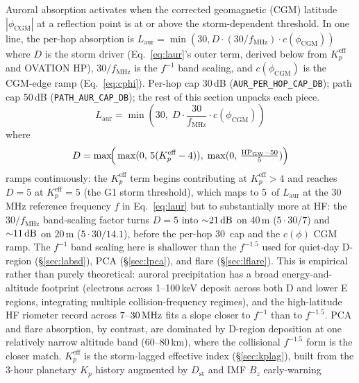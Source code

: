 \documentclass[11pt,a4paper]{article}
\newcommand{\SI}[2]{#1\,\text{#2}}
\newcommand{\dB}{\text{dB}}
\newcommand{\MHz}{\text{MHz}}
\begin{document}
Auroral absorption activates when the corrected geomagnetic
(CGM) latitude $|\phi_{\text{CGM}}|$ at a reflection point is
at or above the storm-dependent threshold.  In one line, the
per-hop absorption is
$L_{\text{aur}} = \min(30, D \cdot (30/f_{\text{MHz}}) \cdot
c(\phi_{\text{CGM}}))$ where $D$ is the storm driver
(Eq.~\ref{eq:laur}'s outer term, derived below from
$K_p^{\text{eff}}$ and OVATION HP), $30/f_{\text{MHz}}$ is the
$f^{-1}$ band scaling, and $c(\phi_{\text{CGM}})$ is the
CGM-edge ramp (Eq.~\ref{eq:cphi}).  Per-hop cap 30\,dB
(\texttt{AUR\_PER\_HOP\_CAP\_DB}); path cap 50\,dB
(\texttt{PATH\_AUR\_CAP\_DB}); the rest of this section
unpacks each piece.
\begin{equation}\label{eq:laur}
  L_{\text{aur}} = \min\!\left(30,\; D \cdot \frac{30}{f_{\text{MHz}}}
                                    \cdot c(\phi_{\text{CGM}})\right)
\end{equation}
where
\begin{equation}
  D = \max\!\Bigl(\,
    \max(0,\,5(K_p^{\text{eff}} - 4)),\;\max(0,\,\tfrac{\text{HP}_{\text{GW}} - 50}{5})
  \Bigr)
\end{equation}
ramps continuously: the $K_p^{\text{eff}}$ term begins
contributing at $K_p^{\text{eff}} > 4$ and reaches $D = 5$ at
$K_p^{\text{eff}} = 5$ (the G1 storm threshold), which maps to
\SI{5}{\dB} of $L_{\text{aur}}$ at the 30\,MHz reference
frequency $f$ in Eq.~\ref{eq:laur} but to substantially more at
HF: the $30/f_{\text{MHz}}$ band-scaling factor turns $D = 5$
into ${\sim}\SI{21}{\dB}$ on 40\,m ($5 \cdot 30/7$) and
${\sim}\SI{11}{\dB}$ on 20\,m ($5 \cdot 30/14.1$), before the
per-hop \SI{30}{\dB} cap and the $c(\phi)$ CGM ramp.  The $f^{-1}$
band scaling here is shallower than the $f^{-1.5}$ used for
quiet-day D-region (\S\ref{sec:labsd}), PCA (\S\ref{sec:lpca}),
and flare (\S\ref{sec:lflare}).  This is empirical rather than
purely theoretical: auroral precipitation has a broad
energy-and-altitude footprint (electrons across 1--100\,keV
deposit across both D and lower E regions, integrating multiple
collision-frequency regimes), and the high-latitude HF riometer
record across $7$--$\SI{30}{\MHz}$ fits a slope closer to
$f^{-1}$ than to $f^{-1.5}$.  PCA and flare absorption, by
contrast, are dominated by D-region deposition at one
relatively narrow altitude band (60--80\,km), where the
collisional $f^{-1.5}$ form is the closer match.
$K_p^{\text{eff}}$ is the storm-lagged effective index
(\S\ref{sec:kplag}), built from the 3-hour planetary $K_p$
history augmented by $D_{\text{st}}$ and IMF $B_z$ early-warning
\end{document}
